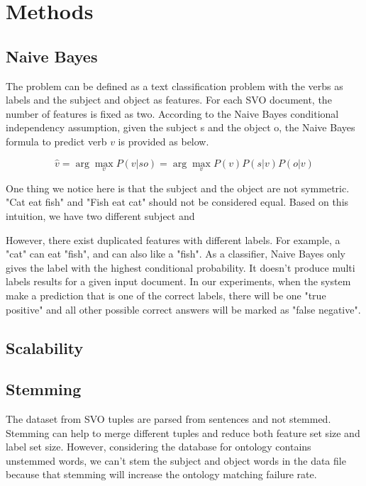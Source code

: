 \section{Methods}

\subsection{Naive Bayes}

The problem can be defined as a text classification problem with the verbs as labels and the subject and object as features. For each SVO document, the number of features is fixed as two. According to the Naive Bayes conditional independency assumption, given the subject s and the object o, the Naive Bayes formula to predict verb $v$ is provided as below.

\begin{equation}
	\hat{v} = \arg\max_v P(v|so) = \arg\max_v P(v)P(s|v)P(o|v)
\end{equation}

One thing we notice here is that the subject and the object are not symmetric. "Cat eat fish" and "Fish eat cat" should not be considered equal. Based on this intuition, we have two different subject and 

However, there exist duplicated features with different labels. For example, a "cat" can eat "fish", and can also like a "fish". As a classifier, Naive Bayes only gives the label with the highest conditional probability. It doesn't produce multi labels results for a given input document. In our experiments, when the system make a prediction that is one of the correct labels, there will be one "true positive" and all other possible correct answers will be marked as "false negative".

\subsection{Scalability}


\subsection{Stemming}

The dataset from SVO tuples are parsed from sentences and not stemmed. Stemming can help to merge different tuples and reduce both feature set size and label set size. However, considering the database for ontology contains unstemmed words, we can't stem the subject and object words in the data file because that stemming will increase the ontology matching failure rate.

